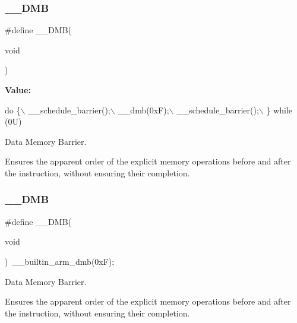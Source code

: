 \subsubsection{\texorpdfstring{\+\_\+\+\_\+\+D\+MB}{\_\_DMB}\hspace{0.1cm}{\footnotesize\ttfamily [1/2]}}
{\footnotesize\ttfamily \#define \+\_\+\+\_\+\+D\+MB(\begin{DoxyParamCaption}\item[{}]{void }\end{DoxyParamCaption})}

{\bfseries Value\+:}
\begin{DoxyCode}
\textcolor{keywordflow}{do} \{\(\backslash\)
                   \_\_schedule\_barrier();\(\backslash\)
                   \_\_dmb(0xF);\(\backslash\)
                   \_\_schedule\_barrier();\(\backslash\)
                \} \textcolor{keywordflow}{while} (0U)
\end{DoxyCode}


Data Memory Barrier. 

Ensures the apparent order of the explicit memory operations before and after the instruction, without ensuring their completion. \mbox{\label{group___c_m_s_i_s___core___instruction_interface_ga671101179b5943990785f36f8c1e2269}} 
\subsubsection{\texorpdfstring{\+\_\+\+\_\+\+D\+MB}{\_\_DMB}\hspace{0.1cm}{\footnotesize\ttfamily [2/2]}}
{\footnotesize\ttfamily \#define \+\_\+\+\_\+\+D\+MB(\begin{DoxyParamCaption}\item[{}]{void }\end{DoxyParamCaption})~\+\_\+\+\_\+builtin\+\_\+arm\+\_\+dmb(0x\+F);}



Data Memory Barrier. 

Ensures the apparent order of the explicit memory operations before and after the instruction, without ensuring their completion. \mbox{\label{group___c_m_s_i_s___core___instruction_interface_ga067d257a2b34565410acefb5afef2203}} 
